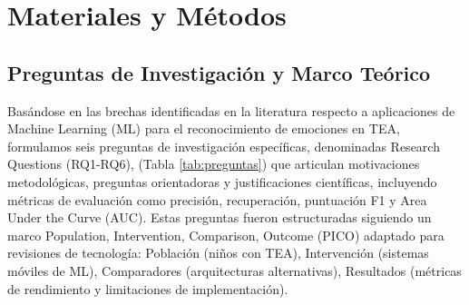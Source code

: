 \documentclass{ieeeaccess}
\begin{document}
	\section{Materiales y Métodos}
	\label{sec:materiales}
	
	\subsection{Preguntas de Investigación y Marco Teórico}
	Basándose en las brechas identificadas en la literatura respecto a aplicaciones de Machine Learning (ML) para el reconocimiento de emociones en TEA, formulamos seis preguntas de investigación específicas, denominadas Research Questions (RQ1-RQ6), (Tabla \ref{tab:preguntas}) que articulan motivaciones metodológicas, preguntas orientadoras y justificaciones científicas, incluyendo métricas de evaluación como precisión, recuperación, puntuación F1 y Area Under the Curve (AUC). Estas preguntas fueron estructuradas siguiendo un marco Population, Intervention, Comparison, Outcome (PICO) adaptado para revisiones de tecnología: Población (niños con TEA), Intervención (sistemas móviles de ML), Comparadores (arquitecturas alternativas), Resultados (métricas de rendimiento y limitaciones de implementación).
	
\end{document}
